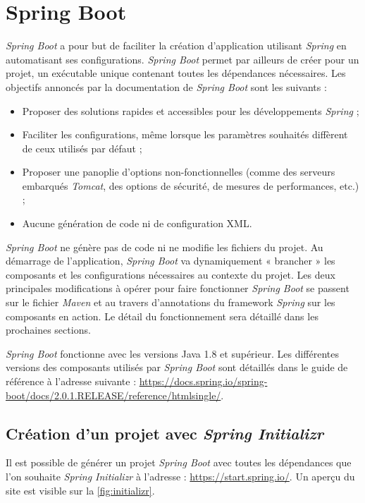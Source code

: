 \documentclass{polytech/polytech}
\begin{document}
\chapter{Spring Boot}

\textit{Spring Boot} a pour but de faciliter la création d'application utilisant \textit{Spring} en automatisant ses configurations. \textit{Spring Boot} permet par ailleurs de créer pour un projet, un exécutable unique contenant toutes les dépendances nécessaires. Les objectifs annoncés par la documentation de \textit{Spring Boot} sont les suivants : 

\begin{itemize}
	\item Proposer des solutions rapides et accessibles pour les développements \textit{Spring} ;
	\item Faciliter les configurations, même lorsque les paramètres souhaités diffèrent de ceux utilisés par défaut ;
	\item Proposer une panoplie d'options non-fonctionnelles (comme des serveurs embarqués \textit{Tomcat}, des options de sécurité, de mesures de performances, etc.) ;
	\item Aucune génération de code ni de configuration XML. 
\end{itemize}

\textit{Spring Boot} ne génère pas de code ni ne modifie les fichiers du projet. Au démarrage de l'application, \textit{Spring Boot} va dynamiquement « brancher » les composants et les configurations nécessaires au contexte du projet. Les deux principales modifications à opérer pour faire fonctionner \textit{Spring Boot} se passent sur le fichier \textit{Maven} et au travers d’annotations du framework \textit{Spring} sur les composants en action. Le détail du fonctionnement sera détaillé dans les prochaines sections. 

\textit{Spring Boot} fonctionne avec les versions Java 1.8 et supérieur. Les différentes versions des composants utilisés par \textit{Spring Boot} sont détaillés dans le guide de référence à l’adresse suivante : \url{https://docs.spring.io/spring-boot/docs/2.0.1.RELEASE/reference/htmlsingle/}.


\section{Création d'un projet avec \textit{Spring Initializr}}

Il est possible de générer un projet \textit{Spring Boot} avec toutes les dépendances que l’on souhaite \textit{Spring Initializr} à l’adresse : \url{https://start.spring.io/}. Un aperçu du site est visible sur la \autoref{fig:initializr}.
\end{document}
